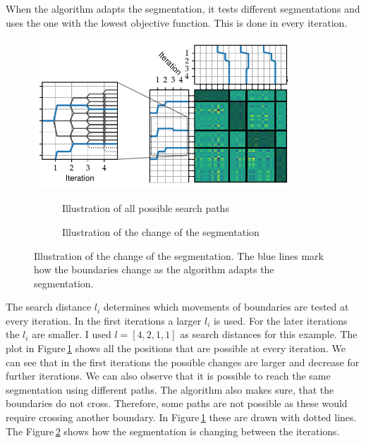 \documentclass[numbers=noenddot,doctype=mastersthesis,BCOR=15mm,biblatex]{ldvbook}%
\begin{document}
When the algorithm adapts the segmentation, it tests different segmentations and uses the one with the lowest objective function.
This is done in every iteration. 
\begin{figure}[!htb]
	\centering
	\includegraphics[width=0.87\textwidth]{Plots/example_move_iterations.pdf}
	\begin{subfigure}[b]{0.3\textwidth}
		\caption{Illustration of all possible search paths}
		\label{fig:example_move_bound_a}
	\end{subfigure}
	\begin{subfigure}[b]{0.55\textwidth}
		\caption{Illustration of the change of the segmentation}
		\label{fig:example_move_bound_b}
	\end{subfigure}
	\caption{Illustration of the change of the segmentation.
		The blue lines mark how the boundaries change as the algorithm adapts the segmentation.
	}
	\label{fig:example_move_bound}
\end{figure}
The search distance $l_i$ determines which movements of boundaries are tested at every iteration.
In the first iterations a larger $l_i$ is used. 
For the later iterations the $l_i$ are smaller.
I used $l = [4,2,1,1]$ as search distances for this example.
The plot in Figure\,\ref{fig:example_move_bound_a} shows all the positions that are possible at every iteration.
We can see that in the first iterations the possible changes are larger and decrease for further iterations.
We can also observe that it is possible to reach the same segmentation using different paths.
The algorithm also makes sure, that the boundaries do not cross.
Therefore, some paths are not possible as these would require crossing another boundary. 
In Figure\,\ref{fig:example_move_bound_a} these are drawn with dotted lines.
The Figure\,\ref{fig:example_move_bound_b} shows how the segmentation is changing between the iterations. 

\end{document}
